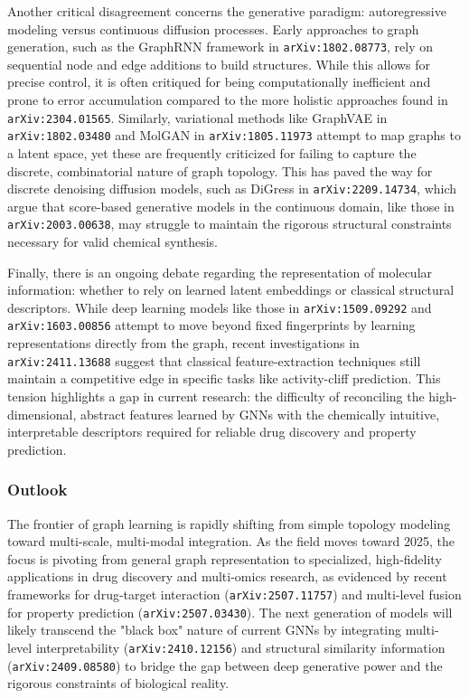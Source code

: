 \documentclass[11pt]{article}
\begin{document}
Another critical disagreement concerns the generative paradigm: autoregressive modeling versus continuous diffusion processes. Early approaches to graph generation, such as the GraphRNN framework in \texttt{arXiv:1802.08773}, rely on sequential node and edge additions to build structures. While this allows for precise control, it is often critiqued for being computationally inefficient and prone to error accumulation compared to the more holistic approaches found in \texttt{arXiv:2304.01565}. Similarly, variational methods like GraphVAE in \texttt{arXiv:1802.03480} and MolGAN in \texttt{arXiv:1805.11973} attempt to map graphs to a latent space, yet these are frequently criticized for failing to capture the discrete, combinatorial nature of graph topology. This has paved the way for discrete denoising diffusion models, such as DiGress in \texttt{arXiv:2209.14734}, which argue that score-based generative models in the continuous domain, like those in \texttt{arXiv:2003.00638}, may struggle to maintain the rigorous structural constraints necessary for valid chemical synthesis.

Finally, there is an ongoing debate regarding the representation of molecular information: whether to rely on learned latent embeddings or classical structural descriptors. While deep learning models like those in \texttt{arXiv:1509.09292} and \texttt{arXiv:1603.00856} attempt to move beyond fixed fingerprints by learning representations directly from the graph, recent investigations in \texttt{arXiv:2411.13688} suggest that classical feature-extraction techniques still maintain a competitive edge in specific tasks like activity-cliff prediction. This tension highlights a gap in current research: the difficulty of reconciling the high-dimensional, abstract features learned by GNNs with the chemically intuitive, interpretable descriptors required for reliable drug discovery and property prediction.

\subsubsection{Outlook}

The frontier of graph learning is rapidly shifting from simple topology modeling toward multi-scale, multi-modal integration. As the field moves toward 2025, the focus is pivoting from general graph representation to specialized, high-fidelity applications in drug discovery and multi-omics research, as evidenced by recent frameworks for drug-target interaction (\texttt{arXiv:2507.11757}) and multi-level fusion for property prediction (\texttt{arXiv:2507.03430}). The next generation of models will likely transcend the "black box" nature of current GNNs by integrating multi-level interpretability (\texttt{arXiv:2410.12156}) and structural similarity information (\texttt{arXiv:2409.08580}) to bridge the gap between deep generative power and the rigorous constraints of biological reality.
\end{document}
